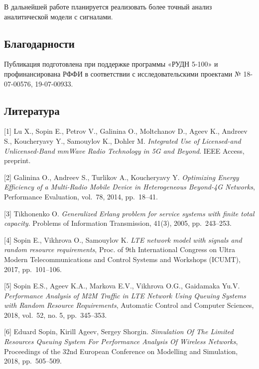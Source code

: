 В дальнейшей работе планируется реализовать более точный анализ
аналитической модели с сигналами.

\hypertarget{ux431ux43bux430ux433ux43eux434ux430ux440ux43dux43eux441ux442ux438}{%
\subsection{Благодарности}\label{ux431ux43bux430ux433ux43eux434ux430ux440ux43dux43eux441ux442ux438}}

Публикация подготовлена при поддержке программы «РУДН 5-100» и
профинансирована РФФИ в соответствии с исследовательскими проектами №
18-07-00576, 19-07-00933.

\hypertarget{ux43bux438ux442ux435ux440ux430ux442ux443ux440ux430}{%
\subsection{Литература}\label{ux43bux438ux442ux435ux440ux430ux442ux443ux440ux430}}

{[}1{]} Lu X., Sopin E., Petrov V., Galinina O., Moltchanov D., Ageev
K., Andreev S., Koucheryavy Y., Samouylov K., Dohler M. \emph{Integrated
Use of Licensed-and Unlicensed-Band mmWave Radio Technology in 5G and
Beyond}. IEEE Access, preprint.

{[}2{]} Galinina O., Andreev S., Turlikov A., Koucheryavy Y.
\emph{Optimizing Energy Efficiency of a Multi-Radio Mobile Device in
Heterogeneous Beyond-4G Networks}, Performance Evaluation, vol.~78,
2014, pp.~18--41.

{[}3{]} Tikhonenko O. \emph{Generalized Erlang problem for service
systems with finite total capacity}. Problems of Information
Transmission, 41(3), 2005, pp.~243--253.

{[}4{]} Sopin E., Vikhrova O., Samouylov K. \emph{LTE network model with
signals and random resource requirements}, Proc. of 9th International
Congress on Ultra Modern Telecommunications and Control Systems and
Workshops (ICUMT), 2017, pp.~101--106.

{[}5{]} Sopin E.S., Ageev K.A., Markova E.V., Vikhrova O.G., Gaidamaka
Yu.V. \emph{Performance Analysis of M2M Traffic in LTE Network Using
Queuing Systems with Random Resource Requirements}, Automatic Control
and Computer Sciences, 2018, vol.~52, no. 5, pp.~345--353.

{[}6{]} Eduard Sopin, Kirill Ageev, Sergey Shorgin. \emph{Simulation Of
The Limited Resources Queuing System For Performance Analysis Of
Wireless Networks}, Proceedings of the 32nd European Conference on
Modelling and Simulation, 2018, pp.~505--509.

